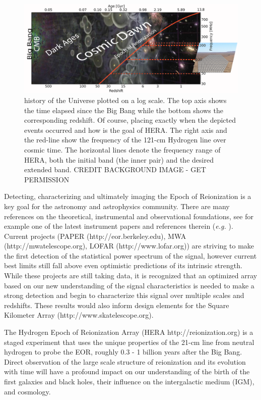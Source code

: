\documentclass{article}
\begin{document}
\begin{figure}[t]
\includegraphics[width=\textwidth]{plots/herauni/herauniall.png}
\caption{history of the Universe plotted on a log scale.  The top axis shows the time elapsed since the Big Bang while the bottom shows the corresponding redshift.  Of course, placing exactly when the depicted events occurred and how is the goal of HERA.  The right axis and the red-line show the frequency of the 121-cm Hydrogen line over cosmic time.  The horizontal lines denote the frequency range of HERA, both the initial band (the inner pair) and the desired extended band.  CREDIT BACKGROUND IMAGE - GET PERMISSION
\label{fig:cosmos}}
\end{figure}

Detecting, characterizing and ultimately imaging the Epoch of Reionization is a key goal for the astronomy and astrophysics community. There are many references on the theoretical, instrumental and observational foundations, see for example one of the latest instrument papers and references therein ({\em e.g.} {\cite{2015arXiv150206016A}}).  Current projects (PAPER (http://eor.berkeley.edu), MWA (http://mwatelescope.org), LOFAR (http://www.lofar.org)) are striving to make the first detection of the statistical power spectrum of the signal, however current best limits still fall above even optimistic predictions of its intrinsic strength.  While these projects are still taking data, it is recognized that an optimized array based on our new understanding of the signal characteristics is needed to make a strong detection and begin to characterize this signal over multiple scales and redshifts.  These results would also inform design elements for the Square Kilometer Array (http://www.skatelescope.org).

The Hydrogen Epoch of Reionization Array (HERA http://reionization.org) is a staged experiment that uses the unique properties of the 21-cm line from neutral hydrogen to probe the EOR, roughly 0.3 - 1 billion years after the Big Bang. Direct observation of the large scale structure of reionization and its evolution with time will have a profound impact on our understanding of the birth of the first galaxies and black holes, their influence on the intergalactic medium (IGM), and cosmology.
\end{document}
